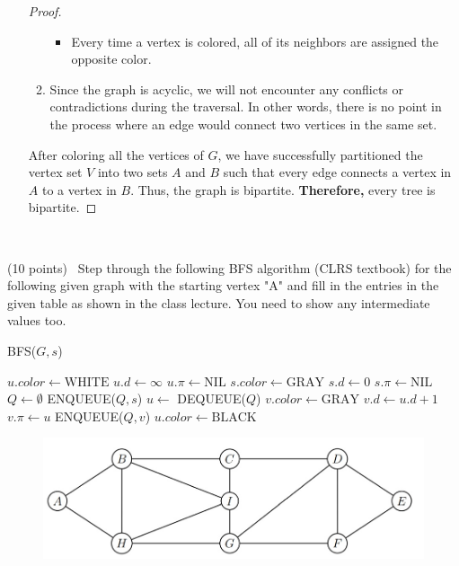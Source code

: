 \documentclass[12pt]{article}
\newcommand{\vs}{\vspace{2mm}}
\begin{document}
\begin{itemize}
\begin{proof}
\begin{enumerate}
        \begin{itemize}
            \item Every time a vertex is colored, all of its neighbors are assigned the opposite color.
        \end{itemize}
        \item Since the graph is acyclic, we will not encounter any conflicts or contradictions during the traversal. In other words, there is no point in the process where an edge would connect two vertices in the same set.
    \end{enumerate}
    \noindent After coloring all the vertices of \( G \), we have successfully partitioned the vertex set \( V \) into two sets \( A \) and \( B \) such that every edge connects a vertex in \( A \) to a vertex in \( B \). Thus, the graph is bipartite.
    \textbf{Therefore,} every tree is bipartite.
    \end{proof}
\end{itemize}

\vs\

\newpage
{} (10 points)
\vs\
Step through the following  BFS algorithm (CLRS textbook) for the following given graph with the starting vertex "A" and fill in the entries in the given table as shown in the class lecture. You need to show any intermediate values too.

\begin{algorithm}
\caption{BFS($G, s$)}
\begin{algorithmic}[1]
    \State $u.color \gets \text{WHITE}$
    \State $u.d \gets \infty$
    \State $u.\pi \gets \text{NIL}$
\EndFor
\State $s.color \gets \text{GRAY}$
\State $s.d \gets 0$
\State $s.\pi \gets \text{NIL}$
\State $Q \gets \emptyset$
\State ENQUEUE($Q, s$)
    \State $u \gets$ DEQUEUE($Q$)
            \State $v.color \gets \text{GRAY}$
            \State $v.d \gets u.d + 1$
            \State $v.\pi \gets u$
            \State ENQUEUE($Q, v$)
        \EndIf
    \EndFor
    \State $u.color \gets \text{BLACK}$
\EndWhile
\end{algorithmic}
\end{algorithm}

\begin{figure}[!h]
\centering
\includegraphics[scale=.74]{graph-image-v1.jpg}
\end{figure}
\end{document}
